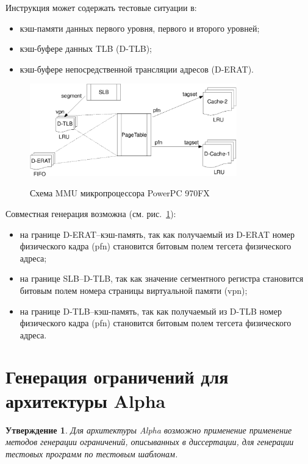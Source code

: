 \documentclass[14pt]{extreport}
\newtheorem{utv}{Утверждение}
\begin{document}
Инструкция может содержать тестовые ситуации в:
\begin{itemize}
  \item кэш-памяти данных первого уровня, первого и второго уровней;
  \item кэш-буфере данных TLB (D-TLB);
  \item кэш-буфере непосредственной трансляции адресов (D-ERAT).
\end{itemize}

\begin{figure}[h] \center
  \includegraphics[width=0.8\textwidth]{4.analysis/ppc}\\
  \caption{Схема MMU микропроцессора PowerPC 970FX}\label{powerpc_mmu_scheme}
\end{figure}

Совместная генерация возможна (см. рис.~\ref{powerpc_mmu_scheme}):
\begin{itemize}
  \item на границе D-ERAT--кэш-память, так как получаемый из D-ERAT номер
физического кадра (pfn) становится битовым полем тегсета физического
адреса;
  \item на границе SLB--D-TLB, так как значение сегментного регистра
  становится битовым полем номера страницы виртуальной памяти (vpn);
  \item на границе D-TLB--кэш-память, так как получаемый из D-TLB номер
физического кадра (pfn) становится битовым полем тегсета физического
адреса.
\end{itemize}

\section{Генерация ограничений для архитектуры Alpha}

\begin{utv}
Для архитектуры Alpha возможно применение применение методов
генерации ограничений, описыванных в диссертации, для генерации
тестовых программ по тестовым шаблонам.
\end{utv}
\end{document}
